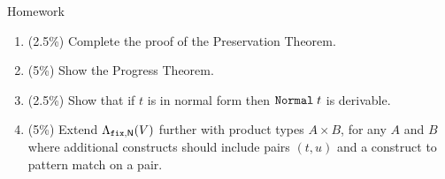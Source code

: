 %

\begin{frame}{Homework}
  \begin{enumerate}
    \item (2.5\%) Complete the proof of the Preservation Theorem.
    \item (5\%) Show the Progress Theorem.
    \item (2.5\%) Show that if $t$ is in normal form then $\mathtt{Normal}\;t$ is derivable.
    \item (5\%) Extend $\Lambda_{\mathtt{fix}, \mathsf{N}}(V)$ further with product types $A \times B$, for any $A$ and $B$ where additional constructs should include pairs $(t, u)$ and a construct to pattern match on a pair.

  \end{enumerate}
  
\end{frame}

%
%
% 
%

\appendix


